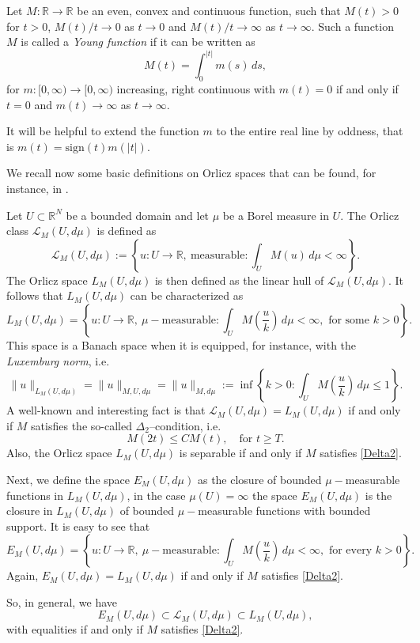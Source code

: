 \documentclass{amsart}
\newcommand{\R}{{\mathbb R}}
\newcommand{\LL}{{\mathcal L}}
\theoremstyle{remark}
\theoremstyle{definition}
\numberwithin{equation}{section}
\begin{document}
Let $M\colon \R\to\R$ be an even, convex and continuous function, such that $M(t)>0$ for $t>0$, $M(t)/t\to 0$ as $t\to 0$ and $M(t)/t\to\infty$ as $t\to\infty$. Such a function $M$ is called a {\em Young function} if it can be written as
$$
M(t) = \int_0^{|t|} m(s)\, ds,
$$
for $m\colon [0,\infty)\to [0,\infty)$ increasing, right continuous with $m(t)=0$ if and only if $t=0$ and $m(t)\to\infty$ as $t\to\infty$.

It will be helpful to extend the function $m$ to the entire real line by oddness, that is $m(t) = \text{sign}(t) m(|t|)$.

We recall now some basic definitions on Orlicz spaces that can be found, for instance, in \cite{KR}.

Let $U\subset \R^N$ be a bounded domain and let $\mu$ be a Borel measure in $U$. The Orlicz class $\LL_M(U, d\mu)$ is defined as
$$
\LL_M(U,d\mu) := \left\{u\colon U\to \R,\ \text{measurable}\colon \int_U M(u)\, d\mu < \infty\right\}.
$$
The Orlicz space $L_M(U,d\mu)$ is then defined as the linear hull of $\LL_M(U,d\mu)$. It follows that $L_M(U,d\mu)$ can be characterized as
$$
L_M(U,d\mu) = \left\{ u\colon U\to \R,\ \text{$\mu-$measurable}\colon \int_U M\left (\frac{u}{k}\right )\, d\mu < \infty, \text{ for some } k>0\right\}.
$$
This space is a Banach space when it is equipped, for instance, with the {\em Luxemburg norm}, i.e.
$$
\|u\|_{L_M(U,d\mu)} = \|u\|_{M,U,d\mu} = \|u\|_{M,d\mu} := \inf\left\{ k>0\colon \int_U M\left(\frac{u}{k}\right)\, d\mu \leq 1\right\}.
$$
A well-known and interesting fact is that $\LL_M(U,d\mu) = L_M(U,d\mu)$ if and only if $M$ satisfies the so-called $\Delta_2$--condition, i.e.
\begin{equation}\label{Delta2}
M(2t)\le CM(t),\quad \text{for } t\ge T.
\end{equation}
Also, the Orlicz space $L_M(U,d\mu)$ is separable if and only if $M$ satisfies \eqref{Delta2}.

Next, we define the space $E_M(U,d\mu)$ as the closure of bounded $\mu-$measurable functions in $L_M(U,d\mu)$, in the case $\mu(U)=\infty$ the space $E_M(U,d\mu)$ is the closure in $L_M(U,d\mu)$ of bounded $\mu-$measurable functions with bounded support. It is easy to see that
$$
E_M(U,d\mu) = \left\{ u\colon U\to \R,\ \text{$\mu-$measurable}\colon \int_U M\left (\frac{u}{k}\right )\, d\mu < \infty, \text{ for every } k>0\right\}.
$$
Again, $E_M(U,d\mu)=L_M(U,d\mu)$ if and only if $M$ satisfies \eqref{Delta2}.

So, in general, we have
$$
E_M(U,d\mu)\subset \LL_M(U,d\mu)\subset L_M(U,d\mu),
$$
with equalities if and only if $M$ satisfies \eqref{Delta2}.
\end{document}
